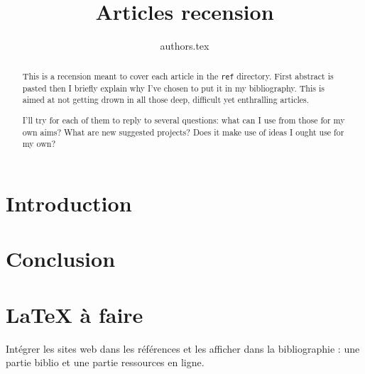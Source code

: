 \documentclass[12pt,onecolumn]{article}
\title{Articles recension}
\author{{authors.tex}}
\newcommand\directory{../../}
\begin{document}
\maketitle
{}
\begin{abstract}
\par This is a recension meant to cover each article in the \texttt{ref} directory. First abstract is pasted then I briefly explain why I've chosen to put it in my bibliography. This is aimed at not getting drown in all those deep, difficult yet enthralling articles.\par I'll try for each of them to reply to several questions: what can I use from those for my own aims? What are new suggested projects? Does it make use of ideas I ought use for my own?
\end{abstract}

\tableofcontents
\cleardoublepage

\section*{Introduction}

\section{}



\section*{Conclusion}

\section{\LaTeX{} à faire}
Intégrer les sites web dans les références et les afficher dans la bibliographie : une partie \og biblio \fg{} et une partie \og ressources en ligne\fg{}.


\end{document}
